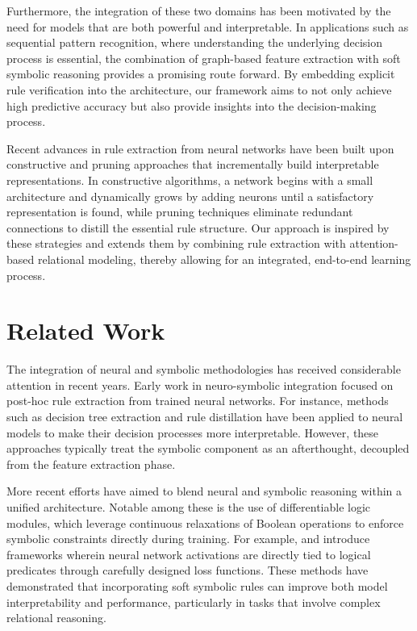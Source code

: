 \documentclass[11pt]{article}
\begin{document}
Furthermore, the integration of these two domains has been motivated by the need for models that are both powerful and interpretable. In applications such as sequential pattern recognition, where understanding the underlying decision process is essential, the combination of graph-based feature extraction with soft symbolic reasoning provides a promising route forward. By embedding explicit rule verification into the architecture, our framework aims to not only achieve high predictive accuracy but also provide insights into the decision-making process.

Recent advances in rule extraction from neural networks have been built upon constructive and pruning approaches that incrementally build interpretable representations. In constructive algorithms, a network begins with a small architecture and dynamically grows by adding neurons until a satisfactory representation is found, while pruning techniques eliminate redundant connections to distill the essential rule structure. Our approach is inspired by these strategies and extends them by combining rule extraction with attention-based relational modeling, thereby allowing for an integrated, end-to-end learning process.

\section{Related Work}
The integration of neural and symbolic methodologies has received considerable attention in recent years. Early work in neuro-symbolic integration focused on post-hoc rule extraction from trained neural networks. For instance, methods such as decision tree extraction and rule distillation have been applied to neural models to make their decision processes more interpretable. However, these approaches typically treat the symbolic component as an afterthought, decoupled from the feature extraction phase.

More recent efforts have aimed to blend neural and symbolic reasoning within a unified architecture. Notable among these is the use of differentiable logic modules, which leverage continuous relaxations of Boolean operations to enforce symbolic constraints directly during training. For example, \cite{ref:softlogic1} and \cite{ref:softlogic2} introduce frameworks wherein neural network activations are directly tied to logical predicates through carefully designed loss functions. These methods have demonstrated that incorporating soft symbolic rules can improve both model interpretability and performance, particularly in tasks that involve complex relational reasoning.
\end{document}
